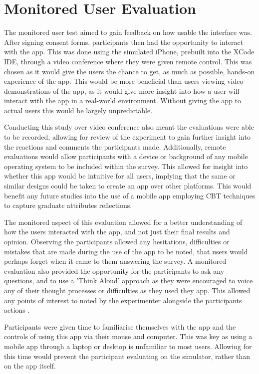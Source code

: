 \documentclass{l4proj}
\begin{document}
\section{Monitored User Evaluation}

The monitored user test aimed to gain feedback on how usable the interface was. After signing consent forms, participants then had the opportunity to interact with the app. This was done using the simulated iPhone, prebuilt into the XCode IDE, through a video conference where they were given remote control. This was chosen as it would give the users the chance to get, as much as possible, hands-on experience of the app. This would be more beneficial than users viewing video demonstrations of the app, as it would give more insight into how a user will interact with the app in a real-world environment. Without giving the app to actual users this would be largely unpredictable. 
 
Conducting this study over video conference also meant the evaluations were able to be recorded, allowing for review of the experiment to gain further insight into the reactions and comments the participants made. Additionally, remote evaluations would allow participants with a device or background of any mobile operating system to be included within the survey. This allowed for insight into whether this app would be intuitive for all users, implying that the same or similar designs could be taken to create an app over other platforms. This would benefit any future studies into the use of a mobile app employing CBT techniques to capture graduate attributes reflections. 

The monitored aspect of this evaluation allowed for a better understanding of how the users interacted with the app, and not just their final results and opinion. Observing the participants allowed any hesitations, difficulties or mistakes that are made during the use of the app to be noted, that users would perhaps forget when it came to them answering the survey. A monitored evaluation also provided the opportunity for the participants to ask any questions, and to use a 'Think Aloud' approach as they were encouraged to voice any of their thought processes or difficulties as they used they app. This allowed any points of interest to noted by the experimenter alongside the participants actions \citep{lewis_task-centered_1994}.
 
Participants were given time to familiarise themselves with the app and the controls of using this app via their mouse and computer. This was key as using a mobile app through a laptop or desktop is unfamiliar to most users. Allowing for this time would prevent the participant evaluating on the simulator, rather than on the app itself. 
 
\end{document}

